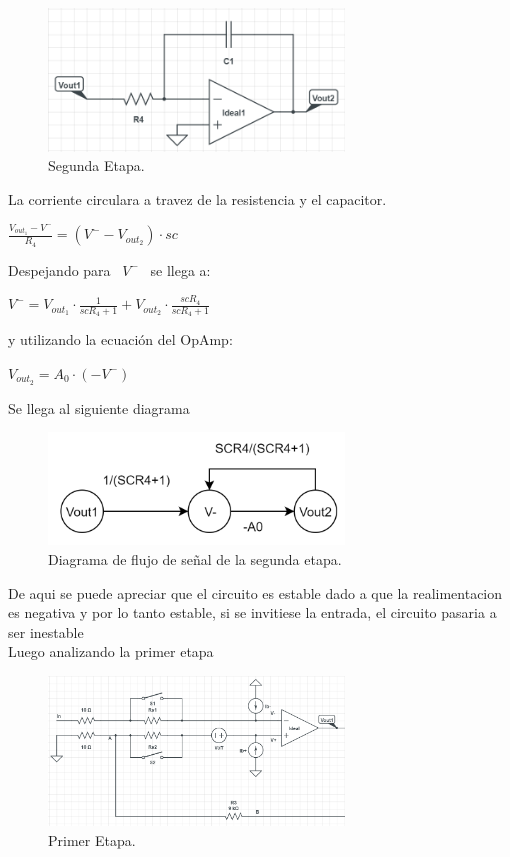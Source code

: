 \begin{figure}[htb]	
	\centering
	\includegraphics[width=0.7\textwidth]{Ejercicio3/imagenes/SegundaEtapa.PNG}
	\caption{Segunda Etapa.}
	\label{fig:SegundaEtapa}
\end{figure}
La corriente circulara a travez de la resistencia y el capacitor.\\
\begin{center}
$ \frac{V_{out_1}-V^-}{R_4} = (V^--V_{out_2})\cdot sc$ \\
\end{center}
 Despejando para \ $V^-$ \ se llega a: \\
\begin{center}
$V^- = V_{out_1} \cdot \frac{1}{scR_4+1}+V_{out_2} \cdot \frac{scR_4}{scR_4+1}$\\\end{center}
y utilizando la ecuación del OpAmp:\\
\begin{center}
$V_{out_2}=A_0 \cdot (-V^-)$
\end{center}
Se llega al siguiente diagrama
\begin{figure}[H]	
	\centering
	\includegraphics[width=0.7\textwidth]{Ejercicio3/imagenes/SegundaEtapaDiagrama.PNG}
	\caption{Diagrama de flujo de señal de la segunda etapa.}
	\label{fig:SegundaEtapaDiagrama}
\end{figure}
De aqui se puede apreciar que el circuito es estable dado a que la realimentacion es negativa y por lo tanto estable, si se invitiese la entrada, el circuito pasaria a ser inestable\\
Luego analizando la primer etapa
\begin{figure}[H]	
	\centering
	\includegraphics[width=0.7\textwidth]{Ejercicio3/imagenes/PrimeraEtapa.PNG}
	\caption{Primer Etapa.}
	\label{fig:PrimerEtapa}
\end{figure}
